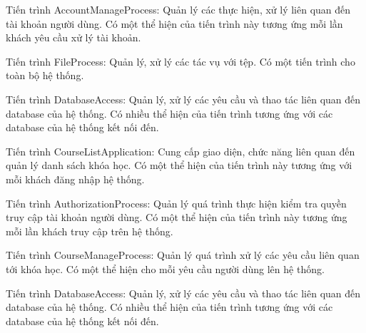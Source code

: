 \documentclass[./../main_file.tex]{subfiles}
\begin{document}
\begin{description}
\item Tiến trình AccountManageProcess: Quản lý các thực hiện, xử lý liên quan đến tài khoản người dùng.
Có một thể hiện của tiến trình này tương ứng mỗi lần khách yêu cầu xử lý tài khoản.
\item Tiến trình FileProcess: Quản lý, xử lý các tác vụ với tệp.
Có một tiến trình cho toàn bộ hệ thống.
\item Tiến trình DatabaseAccess: Quản lý, xử lý các yêu cầu và thao tác liên quan đến database của hệ thống. Có nhiều thể hiện của tiến trình tương ứng với các database của hệ thống kết nối đến.
\item Tiến trình CourseListApplication: Cung cấp giao diện, chức năng liên quan đến quản lý danh sách khóa học. Có một thể hiện của tiến trình này tương ứng với mỗi khách đăng nhập hệ thống.
\item Tiến trình AuthorizationProcess: Quản lý quá trình thực hiện kiểm tra quyền truy cập tài khoản người dùng.
Có một thể hiện của tiến trình này tương ứng mỗi lần khách truy cập trên hệ thống.
\item Tiến trình CourseManageProcess: Quản lý quá trình xử lý các yêu cầu liên quan tới khóa học.
Có một thể hiện cho mỗi yêu cầu người dùng lên hệ thống.
\item Tiến trình DatabaseAccess: Quản lý, xử lý các yêu cầu và thao tác liên quan đến database của hệ thống. Có nhiều thể hiện của tiến trình tương ứng với các database của hệ thống kết nối đến.
\end{description}
\end{document}
